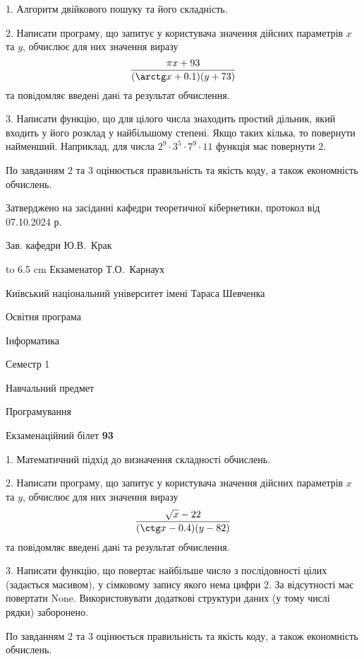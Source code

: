 \documentclass[12pt, ukrainian]{article}
\begin{document}
{%
1. Алгоритм двійкового пошуку та його складність.%
\par
2. Написати програму, що запитує у користувача значення дійсних параметрів $x$ та $y$, обчислює для них значення виразу 
$$\frac{\pi x + 93}{(\arctg x + 0.1) (y + 73)}$$ 
та повiдомляє введенi данi та результат обчислення.

\par
3. Написати функцію, що для цілого числа знаходить простий дільник, який входить у його розклад у найбільшому степені. Якщо таких кілька, то повернути найменший. Наприклад, для числа $2^{9}{\cdot}3^5{\cdot}7^9{\cdot}11$ функція має повернути $2$.

По завданням 2 та 3 оцінюється правильність та якість коду, а також економність обчислень.

}
{\smallskip\smallskip \begin {scriptsize} Затверджено на засіданні кафедри теоретичної кібернетики, протокол   від   07.10.2024 р.\par\smallskip\smallskip\smallskip\smallskip
{\parbox {6.5 cm} {Зав. кафедри \dotfill Ю.В.~Крак}}\hspace {0.7cm} {\hbox to 6.5 cm { Екзаменатор \dotfill Т.О.~Карнаух}} \end{scriptsize}}
\vspace{0.9cm}
{{\begin {scriptsize}\par
{ \center  Київський національний університет імені Тараса Шевченка \par}
{\parbox {5 cm}{Освітня програма \hfill}{\parbox {7 cm}{Інформатика\hfill}}\parbox {6 cm}{\hfill Семестр 1}}\par
{\parbox {5 cm} {Навчальний предмет \hfill}\parbox {7 cm}{Програмування \hfill}\parbox {6cm}{\hfill}\par}\vspace{-15pt} \end{scriptsize}}{\center Екзаменаційний білет \No \textbf { 93 }\par}}
{%
1. Математичний підхід до визначення складності обчислень.%
\par
2. Написати програму, що запитує у користувача значення дійсних параметрів $x$ та $y$, обчислює для них значення виразу 
$$\frac{\sqrt x - 22}{(\ctg x - 0.4) (y - 82)}$$ 
та повiдомляє введенi данi та результат обчислення.

\par
3. Написати функцію, що повертає найбільше число з послідовності цілих (задається масивом), у сімковому запису якого нема цифри 2. За відсутності має повертати None. Використовувати додаткові структури даних (у тому числі рядки) заборонено.

По завданням 2 та 3 оцінюється правильність та якість коду, а також економність обчислень.

}
\end{document}
